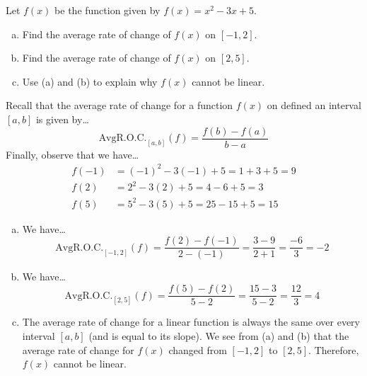 \documentclass[12pt,letterpaper]{exam}
\begin{document}
\examtitle
{} 
\scores
\bottomline
\newpage


\begin{questions}

\newpage
\question[10] Let $f(x)$ be the function given by $f(x)= x^2 - 3x + 5$. 
	\begin{enumerate}[(a)]
	\item Find the average rate of change of $f(x)$ on $[-1, 2]$. 
	\item Find the average rate of change of $f(x)$ on $[2, 5]$.
	\item Use (a) and (b) to explain why $f(x)$ cannot be linear. 
	\end{enumerate} \pspace

\sol Recall that the average rate of change for a function $f(x)$ on defined an interval $[a, b]$ is given by\dots
	\[
	\text{AvgR.O.C.}_{[a,b]}(f)= \dfrac{f(b) - f(a)}{b - a}
	\]
Finally, observe that we have\dots
	\[
	\begin{aligned}
	f(-1)&= (-1)^2 - 3(-1) + 5= 1 + 3 + 5= 9 \\ 
	f(2)&= 2^2 - 3(2) + 5= 4 - 6 + 5= 3 \\
	f(5)&= 5^2 - 3(5) + 5= 25 - 15 + 5= 15
	\end{aligned}
	\]

\begin{enumerate}[(a)]
\item We have\dots
	\[
	\text{AvgR.O.C.}_{[-1, 2]}(f)= \dfrac{f(2) - f(-1)}{2 - (-1)}= \dfrac{3 - 9}{2 + 1}= \dfrac{-6}{3}= -2
	\] \pspace

\item We have\dots
	\[
	\text{AvgR.O.C.}_{[2, 5]}(f)= \dfrac{f(5) - f(2)}{5 - 2}= \dfrac{15 - 3}{5 - 2}= \dfrac{12}{3}= 4
	\] \pspace
 
\item The average rate of change for a linear function is always the same over every interval $[a, b]$ (and is equal to its slope). We see from (a) and (b) that the average rate of change for $f(x)$ changed from $[-1, 2]$ to $[2, 5]$. Therefore, $f(x)$ cannot be linear. 
\end{enumerate}




\end{questions}
\end{document}
